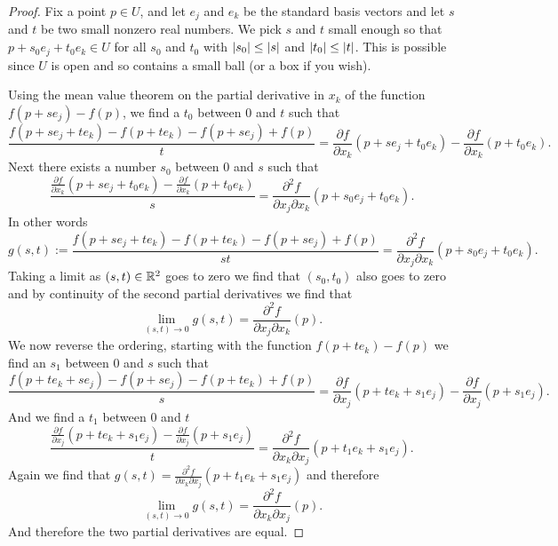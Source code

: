 \begin{proof}
Fix a point $p \in U$, and let $e_j$ and $e_k$ be the standard basis
vectors and let $s$ and $t$ be two small nonzero real numbers.  We pick $s$
and $t$ small enough so that
$p+s_0e_j +t_0e_k \in U$ for all $s_0$ and $t_0$ with
$\lvert {s_0} \rvert \leq \lvert {s} \rvert$ and
$\lvert {t_0} \rvert \leq \lvert {t} \rvert$.  This is possible since $U$ is open and so
contains a small ball (or a box if you wish).

Using the mean value theorem on the partial derivative in $x_k$ of the
function $f(p+se_j)-f(p)$,
we find a $t_0$ between $0$ and $t$ such that
\begin{equation*}
\frac{f(p+se_j + te_k)- f(p+t e_k) - f(p+s e_j)+f(p)}{t}
=
\frac{\partial f}{\partial x_k}(p + s e_j + t_0 e_k)
-
\frac{\partial f}{\partial x_k}(p + t_0 e_k) .
\end{equation*}
Next there exists a number $s_0$ between $0$ and $s$ such that
\begin{equation*}
\frac{\frac{\partial f}{\partial x_k}(p + s e_j + t_0 e_k)
-
\frac{\partial f}{\partial x_k}(p + t_0 e_k)}{s}
=
\frac{\partial^2 f}{\partial x_j \partial x_k}(p + s_0 e_j + t_0 e_k) .
\end{equation*}
In other words
\begin{equation*}
g(s,t) :=
\frac{f(p+se_j + te_k)- f(p+t e_k) - f(p+s e_j)+f(p)}{st}
=
\frac{\partial^2 f}{\partial x_j \partial x_k}(p + s_0 e_j + t_0 e_k) .
\end{equation*}
Taking a limit as $(s,t) \in {\mathbb{R}}^2$ goes to zero we find that $(s_0,t_0)$
also goes to zero and by continuity of the second partial derivatives we
find that
\begin{equation*}
\lim_{(s,t) \to 0} g(s,t) = 
\frac{\partial^2 f}{\partial x_j \partial x_k}(p) .
\end{equation*}
We now reverse the ordering, starting with
the function $f(p+te_k)-f(p)$ we find an $s_1$ between $0$ and $s$ such that
\begin{equation*}
\frac{f(p+te_k + se_j)- f(p+s e_j) - f(p+t e_k)+f(p)}{s}
=
\frac{\partial f}{\partial x_j}(p + t e_k + s_1 e_j)
-
\frac{\partial f}{\partial x_j}(p + s_1 e_j) .
\end{equation*}
And we find a $t_1$ between $0$ and $t$
\begin{equation*}
\frac{\frac{\partial f}{\partial x_j}(p + t e_k + s_1 e_j)
-
\frac{\partial f}{\partial x_j}(p + s_1 e_j)}{t}
=
\frac{\partial^2 f}{\partial x_k \partial x_j}(p + t_1 e_k + s_1 e_j) .
\end{equation*}
Again we find that $g(s,t) = \frac{\partial^2 f}{\partial x_k \partial
x_j}(p + t_1 e_k + s_1 e_j)$ and therefore
\begin{equation*}
\lim_{(s,t) \to 0} g(s,t) = 
\frac{\partial^2 f}{\partial x_k \partial x_j}(p) .
\end{equation*}
And therefore the two partial derivatives are equal.
\end{proof}


